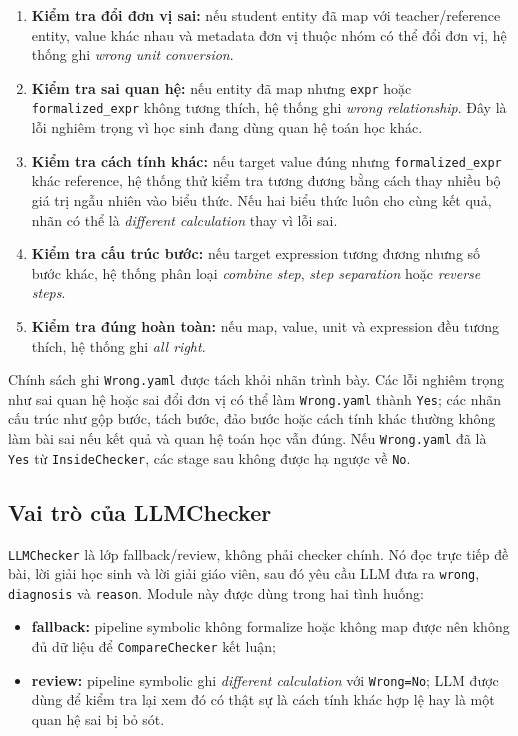 \documentclass[12pt,a4paper]{article}
\begin{document}
\begin{enumerate}[leftmargin=*]
    \item \textbf{Kiểm tra đổi đơn vị sai:} nếu student entity đã map với
    teacher/reference entity, value khác nhau và metadata đơn vị thuộc nhóm có
    thể đổi đơn vị, hệ thống ghi \textit{wrong unit conversion}.
    \item \textbf{Kiểm tra sai quan hệ:} nếu entity đã map nhưng
    \texttt{expr} hoặc \texttt{formalized\_expr} không tương thích, hệ thống ghi
    \textit{wrong relationship}. Đây là lỗi nghiêm trọng vì học sinh đang dùng
    quan hệ toán học khác.
    \item \textbf{Kiểm tra cách tính khác:} nếu target value đúng nhưng
    \texttt{formalized\_expr} khác reference, hệ thống thử kiểm tra tương đương
    bằng cách thay nhiều bộ giá trị ngẫu nhiên vào biểu thức. Nếu hai biểu thức
    luôn cho cùng kết quả, nhãn có thể là \textit{different calculation} thay vì
    lỗi sai.
    \item \textbf{Kiểm tra cấu trúc bước:} nếu target expression tương đương
    nhưng số bước khác, hệ thống phân loại \textit{combine step},
    \textit{step separation} hoặc \textit{reverse steps}.
    \item \textbf{Kiểm tra đúng hoàn toàn:} nếu map, value, unit và expression
    đều tương thích, hệ thống ghi \textit{all right}.
\end{enumerate}

Chính sách ghi \texttt{Wrong.yaml} được tách khỏi nhãn trình bày. Các lỗi nghiêm
trọng như sai quan hệ hoặc sai đổi đơn vị có thể làm \texttt{Wrong.yaml} thành
\texttt{Yes}; các nhãn cấu trúc như gộp bước, tách bước, đảo bước hoặc cách tính
khác thường không làm bài sai nếu kết quả và quan hệ toán học vẫn đúng. Nếu
\texttt{Wrong.yaml} đã là \texttt{Yes} từ \texttt{InsideChecker}, các stage sau
không được hạ ngược về \texttt{No}.

\subsection{Vai trò của LLMChecker}

\texttt{LLMChecker} là lớp fallback/review, không phải checker chính. Nó đọc
trực tiếp đề bài, lời giải học sinh và lời giải giáo viên, sau đó yêu cầu LLM
đưa ra \texttt{wrong}, \texttt{diagnosis} và \texttt{reason}. Module này được
dùng trong hai tình huống:

\begin{itemize}[leftmargin=*]
    \item \textbf{fallback:} pipeline symbolic không formalize hoặc không map
    được nên không đủ dữ liệu để \texttt{CompareChecker} kết luận;
    \item \textbf{review:} pipeline symbolic ghi \textit{different calculation}
    với \texttt{Wrong=No}; LLM được dùng để kiểm tra lại xem đó có thật sự là
    cách tính khác hợp lệ hay là một quan hệ sai bị bỏ sót.
\end{itemize}
\end{document}
